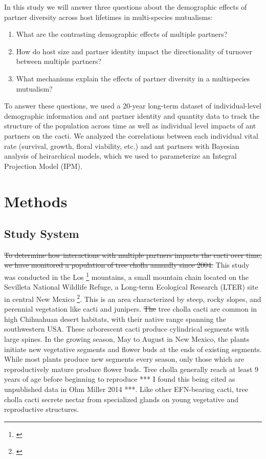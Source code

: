\documentclass[12pt,a4paper]{article}
\newcommand{\tom}[2]{{\color{red}{#1}}\footnote{\textit{\color{red}{#2}}}}
\begin{document}
In this study we will answer three questions about the demographic effects of partner diversity across host lifetimes in multi-species mutualisms:
\begin{enumerate}
	\item{What are the contrasting demographic effects of multiple partners?}
	\item{How do host size and partner identity impact the directionality of turnover between multiple partners?}
	\item{What mechanisms explain the effects of partner diversity in a multispecies mutualism?}
\end{enumerate}


To answer these questions, we used a 20-year long-term dataset of individual-level demographic information and ant partner identity and quantity data to track the structure of the population across time as well as individual level impacts of ant partners on the cacti.
We analyzed the correlations between each individual vital rate (survival, growth, floral viability, etc.) and ant partners with Bayesian analysis of heirarchical models, which we used to parameterize an Integral Projection Model (IPM).



\section*{Methods}
\subsection*{Study System}

\st{To determine how interactions with multiple partners impacts the cacti over time, we have monitored a population of tree cholla annually since 2004.} 
This study was conducted in the Los \tom{Pinos}{there is an accent on the n} mountains, a small mountain chain located on the Sevilleta National Wildlife Refuge, a Long-term Ecological Research (LTER) site in central New Mexico \tom{(34*20’5.3’’N, 106*37’53.2’’W)}{I would not give lat-long here. We should provied lat-long of each plot as part of the full data that we make available.}.
This is an area characterized by steep, rocky slopes, and perennial vegetation like cacti and junipers. 
\st{The} tree cholla cacti are common in high Chihuahuan desert habitats, with their native range spanning the southwestern USA\cite{Benson1982}. 
These arborescent cacti produce cylindrical segments with large spines. 
In the growing season, May to August in New Mexico, the plants initiate new vegetative segments and flower buds at the ends of existing segments. 
While most plants produce new segments every season, only those which are reproductively mature produce flower buds. 
Tree cholla generally reach at least 9 years of age before beginning to reproduce *** I found this being cited as unpublished data in Ohm Miller 2014 ***. 
Like other EFN-bearing cacti, tree cholla cacti secrete nectar from specialized glands on young vegetative and reproductive structures\cite{Ness2006,Oliveira1999}.
\end{document}
